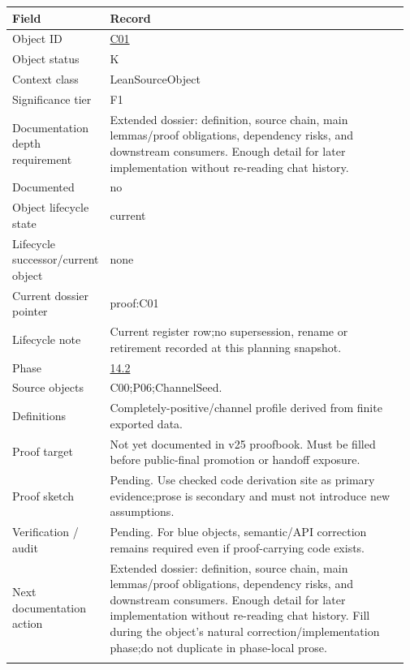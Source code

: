 \begin{longtable}{L{0.16\linewidth} L{0.81\linewidth}}
\hline
\textbf{Field} & \textbf{Record}\\
\hline
Object ID & \hyperlink{object-row-C01}{C01}\\
\hline\addlinespace[0.20em]
Object status & K\\
\hline\addlinespace[0.20em]
Context class & LeanSourceObject\\
\hline\addlinespace[0.20em]
Significance tier & F1\\
\hline\addlinespace[0.20em]
Documentation depth requirement & Extended dossier: definition, source chain, main lemmas/\allowbreak{}proof obligations, dependency risks, and downstream consumers. Enough detail for later implementation without re-reading chat history.\\
\hline\addlinespace[0.20em]
Documented & no\\
\hline\addlinespace[0.20em]
Object lifecycle state & current\\
\hline\addlinespace[0.20em]
Lifecycle successor/\allowbreak{}current object & none\\
\hline\addlinespace[0.20em]
Current dossier pointer & proof:C01\\
\hline\addlinespace[0.20em]
Lifecycle note & Current register row;\newline no supersession, rename or retirement recorded at this planning snapshot.\\
\hline\addlinespace[0.20em]
Phase & \hyperlink{phase-row-14-2}{14.2}\\
\hline\addlinespace[0.20em]
Source objects & C00;\newline P06;\newline ChannelSeed.\\
\hline\addlinespace[0.20em]
Definitions & Completely-positive/\allowbreak{}channel profile derived from finite exported data.\\
\hline\addlinespace[0.20em]
Proof target & Not yet documented in v25 proofbook. Must be filled before public-final promotion or handoff exposure.\\
\hline\addlinespace[0.20em]
Proof sketch & Pending. Use checked code derivation site as primary evidence;\newline prose is secondary and must not introduce new assumptions.\\
\hline\addlinespace[0.20em]
Verification /\allowbreak{} audit & Pending. For blue objects, semantic/\allowbreak{}API correction remains required even if proof-carrying code exists.\\
\hline\addlinespace[0.20em]
Next documentation action & Extended dossier: definition, source chain, main lemmas/\allowbreak{}proof obligations, dependency risks, and downstream consumers. Enough detail for later implementation without re-reading chat history. Fill during the object's natural correction/\allowbreak{}implementation phase;\newline do not duplicate in phase-local prose.\\
\hline\addlinespace[0.20em]
\end{longtable}
